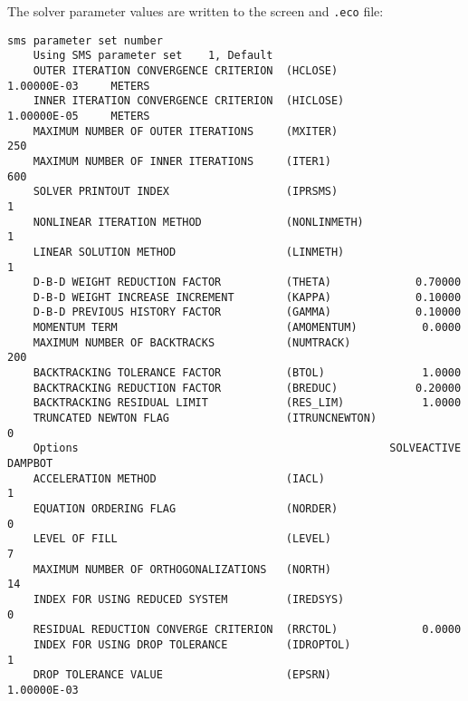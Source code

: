 The solver parameter values are written to the screen and \texttt{.eco} file:
\begin{verbatim}
sms parameter set number
	Using SMS parameter set    1, Default
	OUTER ITERATION CONVERGENCE CRITERION  (HCLOSE)            1.00000E-03     METERS
	INNER ITERATION CONVERGENCE CRITERION  (HICLOSE)           1.00000E-05     METERS
	MAXIMUM NUMBER OF OUTER ITERATIONS     (MXITER)                    250
	MAXIMUM NUMBER OF INNER ITERATIONS     (ITER1)                     600
	SOLVER PRINTOUT INDEX                  (IPRSMS)                      1
	NONLINEAR ITERATION METHOD             (NONLINMETH)                  1
	LINEAR SOLUTION METHOD                 (LINMETH)                     1
	D-B-D WEIGHT REDUCTION FACTOR          (THETA)             0.70000
	D-B-D WEIGHT INCREASE INCREMENT        (KAPPA)             0.10000
	D-B-D PREVIOUS HISTORY FACTOR          (GAMMA)             0.10000
	MOMENTUM TERM                          (AMOMENTUM)          0.0000
	MAXIMUM NUMBER OF BACKTRACKS           (NUMTRACK)                  200
	BACKTRACKING TOLERANCE FACTOR          (BTOL)               1.0000
	BACKTRACKING REDUCTION FACTOR          (BREDUC)            0.20000
	BACKTRACKING RESIDUAL LIMIT            (RES_LIM)            1.0000
	TRUNCATED NEWTON FLAG                  (ITRUNCNEWTON)                0
	Options                                                SOLVEACTIVE      DAMPBOT
	ACCELERATION METHOD                    (IACL)                        1
	EQUATION ORDERING FLAG                 (NORDER)                      0
	LEVEL OF FILL                          (LEVEL)                       7
	MAXIMUM NUMBER OF ORTHOGONALIZATIONS   (NORTH)                      14
	INDEX FOR USING REDUCED SYSTEM         (IREDSYS)                     0
	RESIDUAL REDUCTION CONVERGE CRITERION  (RRCTOL)             0.0000
	INDEX FOR USING DROP TOLERANCE         (IDROPTOL)                    1
	DROP TOLERANCE VALUE                   (EPSRN)             1.00000E-03
\end{verbatim}
